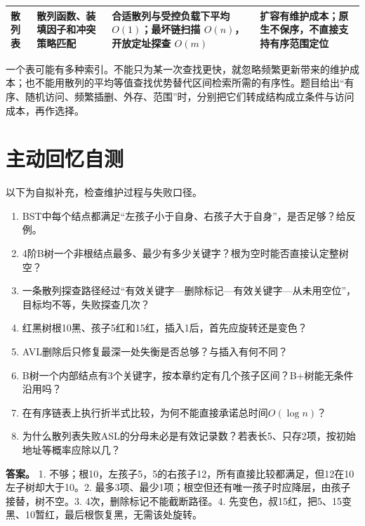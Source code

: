 \begin{wideblock}
\begin{minipage}{\linewidth}
\begin{tabularx}{\linewidth}{@{}YYYY@{}}
散列表 & 散列函数、装填因子和冲突策略匹配 & 合适散列与受控负载下平均 \(O(1)\)；最坏链扫描 \(O(n)\)，开放定址探查 \(O(m)\) & 扩容有维护成本；原生不保序，不直接支持有序范围定位 \\
\bottomrule\end{tabularx}
\end{minipage}\par\medskip

\end{wideblock}

一个表可能有多种索引。不能只为某一次查找更快，就忽略频繁更新带来的维护成本；也不能用散列的平均等值查找优势替代区间检索所需的有序性。题目给出``有序、随机访问、频繁插删、外存、范围''时，分别把它们转成结构成立条件与访问成本，再作选择。

\section{主动回忆自测}\label{DS07-check}

以下为自拟补充，检查维护过程与失败口径。

\begin{enumerate}
\def\labelenumi{\arabic{enumi}.}
\item
  BST中每个结点都满足``左孩子小于自身、右孩子大于自身''，是否足够？给反例。
\item
  4阶B树一个非根结点最多、最少有多少关键字？根为空时能否直接认定整树空？
\item
  一条散列探查路径经过``有效关键字---删除标记---有效关键字---从未用空位''，目标均不等，失败探查几次？
\item
  红黑树根10黑、孩子5红和15红，插入1后，首先应旋转还是变色？
\item
  AVL删除后只修复最深一处失衡是否总够？与插入有何不同？
\item
  B树一个内部结点有3个关键字，按本章约定有几个孩子区间？B+树能无条件沿用吗？
\item
  在有序链表上执行折半式比较，为何不能直接承诺总时间\(O(\log n)\)？
\item
  为什么散列表失败ASL的分母未必是有效记录数？若表长5、只存2项，按初始地址等概率应除以几？
\end{enumerate}

\textbf{答案。} 1. 不够；根10，左孩子5，5的右孩子12，所有直接比较都满足，但12在10左子树却大于10。2. 最多3项、最少1项；根空但还有唯一孩子时应降层，由孩子接替，树不空。3. 4次，删除标记不能截断路径。4. 先变色，叔15红，把5、15变黑、10暂红，最后根恢复黑，无需该处旋转。

